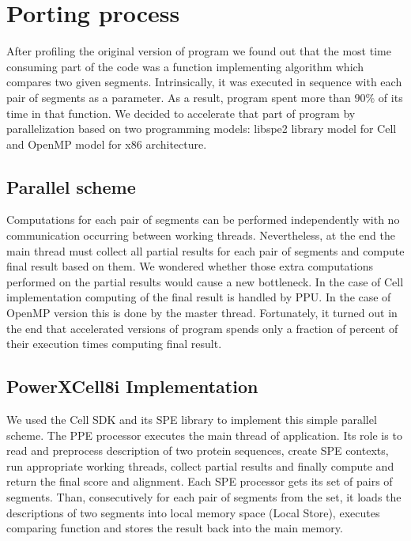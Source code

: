 \section{Porting process}
After profiling the original version of \prog{} program we found out that
the most time consuming part of the code was a function implementing algorithm
which compares two given segments.
Intrinsically, it was executed in sequence with each pair of segments as a
parameter.
As a result, program spent more than $90\%$ of its time in that function.
We decided to accelerate that part of program by parallelization based on two
programming models: libspe2 library model for Cell and OpenMP model for x86
architecture.

\subsection{Parallel scheme}
Computations for each pair of segments can be performed independently with
no communication occurring between working threads.
Nevertheless, at the end the main thread must collect all partial results for
each pair of segments and compute final result based on them.
We wondered whether those extra computations performed on the partial results
would cause a new bottleneck.
In the case of Cell implementation computing of the final result
is handled by PPU.
In the case of OpenMP version this is done by the master thread.
Fortunately, it turned out in the end that accelerated versions of \prog{}
program spends only a fraction of percent of their execution times computing
final result.

\subsection{PowerXCell8i Implementation}
We used the Cell SDK and its SPE library to implement this simple parallel
scheme.
The PPE processor executes the main thread of application.
Its role is to read and preprocess description of two protein sequences, create
SPE contexts, run appropriate working threads, collect partial results and
finally compute and return the final score and alignment.
Each SPE processor gets its set of pairs of segments.
Than, consecutively for each pair of segments from the set, it loads the
descriptions of two segments into local memory space (Local Store),
executes comparing function and stores the result back into the main memory.

